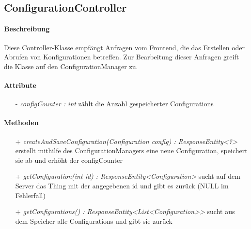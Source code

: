 \subsection{ConfigurationController}

\paragraph{Beschreibung}
Diese Controller-Klasse empfängt Anfragen vom Frontend, die das Erstellen oder Abrufen von Konfigurationen betreffen. Zur Bearbeitung dieser Anfragen greift die Klasse auf den ConfigurationManager zu.


\paragraph{Attribute}
\begin{itemize}
\item[-] \textit{configCounter : int} zählt die Anzahl gespeicherter Configurations
\end{itemize}

\paragraph{Methoden}
\begin{itemize}
\item[+] \textit{ createAndSaveConfiguration(Configuration config) : ResponseEntity<?> }
erstellt mithilfe des ConfigurationManagers eine neue Configuration, speichert sie ab und erhöht der configCounter
\item[+] \textit{getConfiguration(int id) : ResponseEntity<Configuration>}
sucht auf dem Server das Thing mit der angegebenen id und gibt es zurück (NULL im Fehlerfall)
\item[+] \textit{getConfigurations() : ResponseEntity<List<Configuration>> }
sucht aus dem Speicher alle Configurations und gibt sie zurück
\end{itemize}